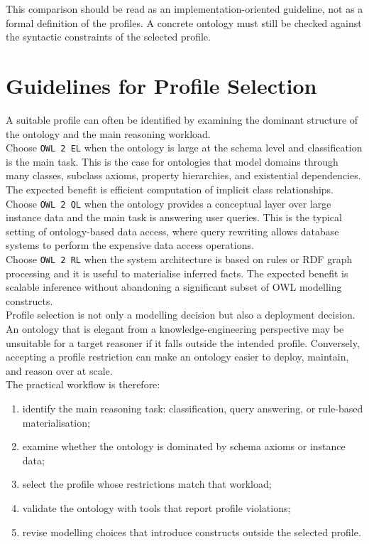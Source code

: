 \documentclass{scrbook}
\begin{document}
	This comparison should be read as an implementation-oriented guideline, not as a formal definition of the profiles. A concrete ontology must still be checked against the syntactic constraints of the selected profile.
	
	\section{Guidelines for Profile Selection}
	
	A suitable profile can often be identified by examining the dominant structure of the ontology and the main reasoning workload.\\
	
	Choose \texttt{OWL 2 EL} when the ontology is large at the schema level and classification is the main task. This is the case for ontologies that model domains through many classes, subclass axioms, property hierarchies, and existential dependencies. The expected benefit is efficient computation of implicit class relationships.\\
	
	Choose \texttt{OWL 2 QL} when the ontology provides a conceptual layer over large instance data and the main task is answering user queries. This is the typical setting of ontology-based data access, where query rewriting allows database systems to perform the expensive data access operations.\\
	
	Choose \texttt{OWL 2 RL} when the system architecture is based on rules or RDF graph processing and it is useful to materialise inferred facts. The expected benefit is scalable inference without abandoning a significant subset of OWL modelling constructs.\\
	
	Profile selection is not only a modelling decision but also a deployment decision. An ontology that is elegant from a knowledge-engineering perspective may be unsuitable for a target reasoner if it falls outside the intended profile. Conversely, accepting a profile restriction can make an ontology easier to deploy, maintain, and reason over at scale.\\
	
	The practical workflow is therefore:
	\begin{enumerate}
		\item identify the main reasoning task: classification, query answering, or rule-based materialisation;
		\item examine whether the ontology is dominated by schema axioms or instance data;
		\item select the profile whose restrictions match that workload;
		\item validate the ontology with tools that report profile violations;
		\item revise modelling choices that introduce constructs outside the selected profile.
	\end{enumerate}
	
\end{document}
